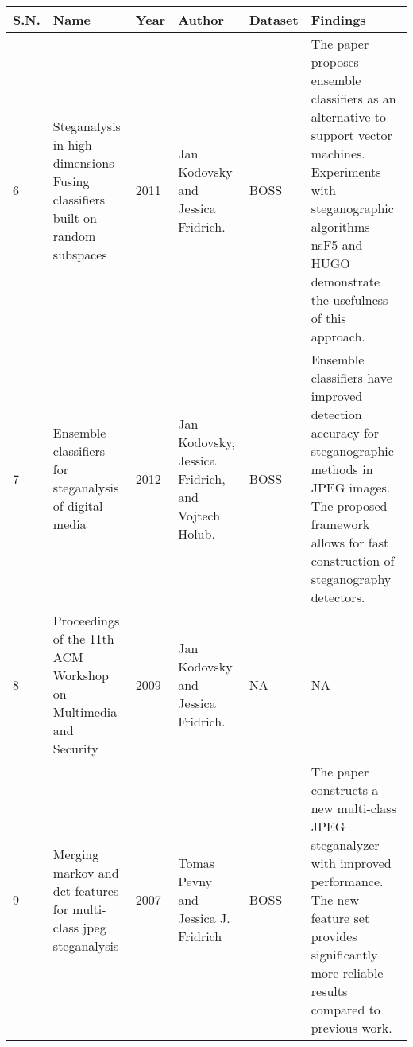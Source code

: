 \clearpage
\begin{table}[!h]
    \begin{tabular}{|p{0.7cm}|p{3cm}|p{0.8cm}|p{3cm}|p{1.3cm}|p{3cm}|}
        \hline
    S.N. & Name                                                                            & Year & Author                                                                                 & Dataset          & Findings                                                                                                                                                                                          \\\hline
    6    & Steganalysis in high dimensions Fusing classifiers built on random subspaces    & 2011 & Jan Kodovsky and Jessica Fridrich.                                                     & BOSS             & The paper proposes ensemble classifiers as an alternative   to support vector machines. Experiments with steganographic algorithms nsF5   and HUGO demonstrate the usefulness of this approach.   \\\hline
    7    & Ensemble classifiers for steganalysis of digital media                          & 2012 & Jan Kodovsky, Jessica Fridrich, and Vojtech Holub.                                     & BOSS             & Ensemble classifiers have improved detection accuracy for steganographic methods in JPEG images. The proposed framework allows for fast construction of steganography detectors.                  \\\hline
    8    & Proceedings of the 11th ACM Workshop on Multimedia and Security                 & 2009 & Jan Kodovsky and Jessica Fridrich.                                                     & NA               & NA                                                                                                                                                                                                \\\hline
        9    & Merging markov and dct features for multi-class jpeg steganalysis               & 2007 & Tomas Pevny and   Jessica J. Fridrich                                                  & BOSS             & The paper   constructs a new multi-class JPEG steganalyzer with improved performance. The   new feature set provides significantly more reliable results compared to   previous work.             \\\hline
    \end{tabular}
\end{table} 
\clearpage

